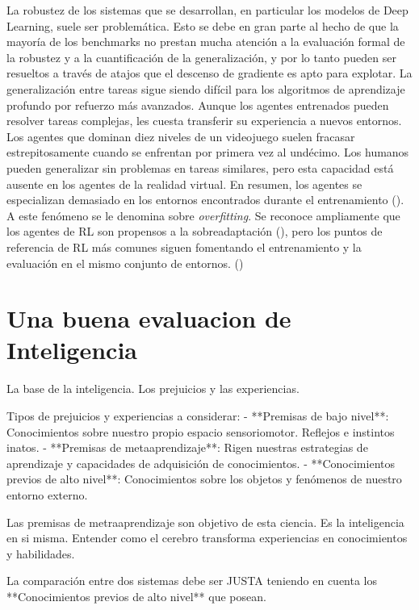 La robustez de los sistemas que se desarrollan, en particular los modelos de Deep Learning, suele ser problemática. Esto se debe en gran parte al hecho de que la mayoría de los benchmarks no prestan mucha atención a la evaluación formal de la robustez y a la cuantificación de la generalización, y por lo tanto pueden ser resueltos a través de atajos que el descenso de gradiente es apto para explotar. La generalización entre tareas sigue siendo difícil para los algoritmos de aprendizaje profundo por refuerzo más avanzados. Aunque los agentes entrenados pueden resolver tareas complejas, les cuesta transferir su experiencia a nuevos entornos. Los agentes que dominan diez niveles de un videojuego suelen fracasar estrepitosamente cuando se enfrentan por primera vez al undécimo. Los humanos pueden generalizar sin problemas en tareas similares, pero esta capacidad está ausente en los agentes de la realidad virtual. En resumen, los agentes se especializan demasiado en los entornos encontrados durante el entrenamiento (\cite{cobbe2019quantifying}). A este fenómeno se le denomina sobre  \textit{overfitting}. Se reconoce ampliamente que los agentes de RL son propensos a la sobreadaptación (\cite{zhang2018study}), pero los puntos de referencia de RL más comunes siguen fomentando el entrenamiento y la evaluación en el mismo conjunto de entornos. (\cite{nichol2018gotta}) 

\section{Una buena evaluacion de Inteligencia}\label{section:state-of-the-art:a-good-measure-of-inteligence}

La base de la inteligencia. Los prejuicios y las experiencias.

Tipos de prejuicios y experiencias a considerar:
- **Premisas de bajo nivel**: Conocimientos sobre nuestro propio espacio sensoriomotor. Reflejos e instintos inatos.
- **Premisas de metaaprendizaje**: Rigen nuestras estrategias de aprendizaje y capacidades de adquisición de conocimientos.
- **Conocimientos previos de alto nivel**: Conocimientos sobre los objetos y fenómenos de nuestro entorno externo.

Las premisas de metraaprendizaje son objetivo de esta ciencia. Es la inteligencia en si misma. Entender como el cerebro transforma experiencias en conocimientos y habilidades.

La comparación entre dos sistemas debe ser JUSTA teniendo en cuenta los **Conocimientos previos de alto nivel** que posean. 


